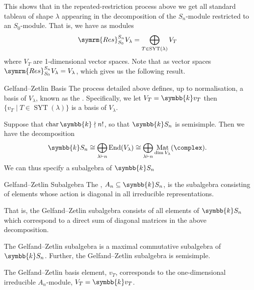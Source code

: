 \documentclass[fleqn]{NotesClass}
\renewcommand{\field}{\symbb{k}}
\DeclareMathOperator{\End}{End}
\newcommand{\isomorphic}{\cong}
\DeclareMathOperator{\Mat}{Mat}
\DeclareMathOperator{\Char}{char}
\newcommand{\partition}{\vdash}
\DeclareMathOperator{\standardYoungTableaux}{SYT}
\newcommand{\Res}{\symrm{Res}}
\begin{document}
    This shows that in the repeated-restriction process above we get all standard tableau of shape \(\lambda\) appearing in the decomposition of the \(S_n\)-module restricted to an \(S_0\)-module.
    That is, we have as modules
    \begin{equation}
        \Res^{S_n}_{S_0} V_\lambda = \bigoplus_{T \in \standardYoungTableaux(\lambda)} V_T
    \end{equation}
    where \(V_T\) are 1-dimensional vector spaces.
    Note that as vector spaces \(\Res^{S_n}_{S_0} V_\lambda = V_\lambda\), which gives us the following result.
    
    \begin{dfn}{Gelfand--Zetlin Basis}{}
        The process detailed above defines, up to normalisation, a basis of \(V_\lambda\), known as the .
        Specifically, we let \(V_T = \field v_T\) then \(\{v_T \mid T \in \standardYoungTableaux(\lambda)\}\) is a basis of \(V_\lambda\).
    \end{dfn}
    
    Suppose that \(\Char \field \nmid n!\), so that \(\field S_n\) is semisimple.
    Then we have the decomposition
    \begin{equation}
        \field S_n \isomorphic \bigoplus_{\lambda \partition n} \End(V_\lambda) \isomorphic \bigoplus_{\lambda \partition n} \Mat_{\dim V_\lambda}(\complex).
    \end{equation}
    We can thus specify a subalgebra of \(\field S_n\)
    
    \begin{dfn}{Gelfand--Zetlin Subalgebra}{}
        The , \(A_n \subseteq \field S_n\), is the subalgebra consisting of elements whose action is diagonal in all irreducible representations.
    \end{dfn}
    
    That is, the Gelfand--Zetlin subalgebra consists of all elements of \(\field S_n\) which correspond to a direct sum of diagonal matrices in the above decomposition.
    
    \begin{lma}{}{}
        The Gelfand--Zetlin subalgebra is a maximal commutative subalgebra of \(\field S_n\).
        Further, the Gelfand--Zetlin subalgebra is semisimple.
    \end{lma}
    
    The Gelfand--Zetlin basis element, \(v_T\), corresponds to the one-dimensional irreducible \(A_n\)-module, \(V_T = \field v_T\).
    
\end{document}
